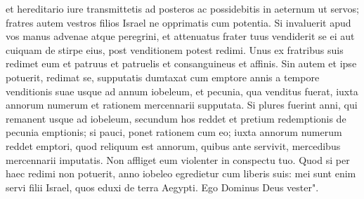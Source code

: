 \begin{biblechapter}
\verse et hereditario iure transmittetis ad posteros ac possidebitis in aeternum ut servos; fratres autem vestros filios Israel ne opprimatis cum potentia. 
\verse Si invaluerit apud vos manus advenae atque peregrini, et attenuatus frater tuus vendiderit se ei aut cuiquam de stirpe eius, 
\verse post venditionem potest redimi. Unus ex fratribus suis redimet eum 
\verse et patruus et patruelis et consanguineus et affinis. Sin autem et ipse potuerit, redimat se, 
\verse supputatis dumtaxat cum emptore annis a tempore venditionis suae usque ad annum iobeleum, et pecunia, qua venditus fuerat, iuxta annorum numerum et rationem mercennarii supputata. 
\verse Si plures fuerint anni, qui remanent usque ad iobeleum, secundum hos reddet et pretium redemptionis de pecunia emptionis;  
\verse si pauci, ponet rationem cum eo; iuxta annorum numerum reddet emptori, quod reliquum est annorum, 
\verse quibus ante servivit, mercedibus mercennarii imputatis. Non affliget eum violenter in conspectu tuo. 
\verse Quod si per haec redimi non potuerit, anno iobeleo egredietur cum liberis suis: 
\verse mei sunt enim servi filii Israel, quos eduxi de terra Aegypti. Ego Dominus Deus vester". 
\end{biblechapter}

